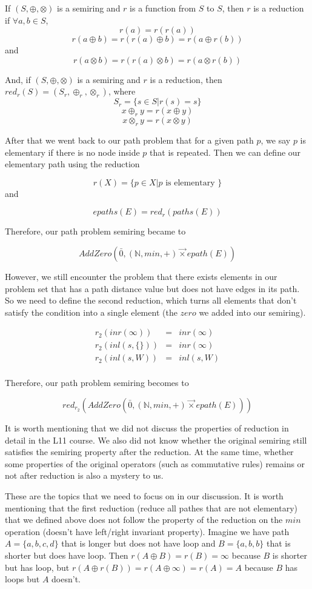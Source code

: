 \documentclass[a4paper,10pt]{article}
\newcommand{\e}[2]{
\begin{equation}
  \label{#1} 
  #2
\end{equation}
}
\begin{document}
If $(S,\oplus,\otimes)$ is a semiring and $r$ is a function from $S$ to $S$, then $r$ is a reduction if $\forall a,b \in S$, 
\[r(a) = r(r(a))\]
\[r(a\oplus b) = r(r(a)\oplus b) = r(a\oplus r(b))\] and 
\[r(a\otimes b) = r(r(a)\otimes b) = r(a\otimes r(b))\]

And, if $(S,\oplus,\otimes)$ is a semiring and $r$ is a reduction, then $red_r(S) = (S_r,\oplus_r,\otimes_r)$, where 
\[S_r = \{s\in S|r(s)= s\}\]
\[x\oplus_r y = r(x\oplus y)\]
\[x\otimes_r y = r(x\otimes y)\]

After that we went back to our path problem that for a given path $p$, we say $p$ is elementary if there is no node inside $p$ that is repeated. Then we can define our elementary path using the reduction 
\e{r:def:elementary}{r(X) = \{p\in X | p \mbox{ is elementary }\}}and 
\e{r:def:elementary_path}{epaths(E) = red_r(paths(E))}

Therefore, our path problem semiring became to 
\e{r:def:path_problem}{AddZero(\bar0,(\mathbb{N},min,+) \overrightarrow{\times} epath(E))}

However, we still encounter the problem that there exists elements in our problem set that has a path distance value but does not have edges in its path. So we need to define the second reduction, which turns all elements that don't satisfy the condition into a single element (the $zero$ we added into our semiring).
\e{r:def:reduction_annihilator}{
\begin{array}{rcl} 
r_2 (inr(\infty)) & = & inr(\infty) \\
r_2 (inl(s,\{\})) & = & inr(\infty) \\
r_2 (inl(s,W))    & = & inl(s,W) \\
\end{array}}
Therefore, our path problem semiring becomes to 
\e{r:def:reduced_path_problem}{red_{r_2}(AddZero(\bar0,(\mathbb{N},min,+) \overrightarrow{\times} epath(E)))}

It is worth mentioning that we did not discuss the properties of reduction in detail in the L11 course. We also did not know whether the original semiring still satisfies the semiring property after the reduction. At the same time, whether some properties of the original operators (such as commutative rules) remains or not after reduction is also a mystery to us.

These are the topics that we need to focus on in our discussion.
It is worth mentioning that the first reduction (reduce all pathes that are not elementary) that we defined above does not follow the property of the reduction on the $min$ operation (doesn't have left/right invariant property). Imagine we have path $A = \{a,b,c,d\}$ that is longer but does not have loop and $B = \{a,b,b\}$ that is shorter but does have loop. Then $r(A\oplus B) = r(B) = \infty$ because $B$ is shorter but has loop, but $r(A\oplus r(B)) = r(A \oplus \infty) = r(A) = A$ because $B$ has loops but $A$ doesn't.
\end{document}
